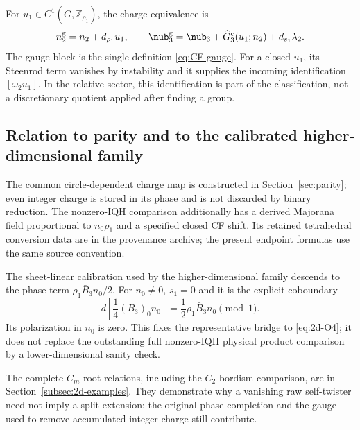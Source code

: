 For $u_1\in C^1(G,\mathbb Z_{\rho_1})$, the charge equivalence is
\begin{equation}\label{eq:2d-gauge}
 n_2^{\mathrm g}=n_2+d_{\rho_1}u_1,
 \qquad
 \nub_3^{\mathrm g}=\nub_3+\widehat G^c_3(u_1;n_2)+d_{s_1}\lambda_2.
\end{equation}
The gauge block is the single definition \eqref{eq:CF-gauge}. For a closed $u_1$, its Steenrod term vanishes by instability and it supplies the incoming identification $[\omega_2u_1]$. In the relative sector, this identification is part of the classification, not a discretionary quotient applied after finding a group.

\subsection{Relation to parity and to the calibrated higher-dimensional family}
The common circle-dependent charge map is constructed in Section~\ref{sec:parity}; even integer charge is stored in its phase and is not discarded by binary reduction. The nonzero-IQH comparison additionally has a derived Majorana field proportional to $\bar n_0\rho_1$ and a specified closed CF shift. Its retained tetrahedral conversion data are in the provenance archive; the present endpoint formulas use the same source convention.

The sheet-linear calibration used by the higher-dimensional family descends to the phase term
$\rho_1\bar B_3n_0/2$. For $n_0\ne0$, $s_1=0$ and it is the explicit coboundary
\begin{equation}\label{eq:2d-endpoint-rephase}
 d\left[\frac14(B_3)_0n_0\right]=\frac12\rho_1\bar B_3n_0\pmod1.
\end{equation}
Its polarization in $n_0$ is zero. This fixes the representative bridge to \eqref{eq:2d-O4}; it does not replace the outstanding full nonzero-IQH physical product comparison by a lower-dimensional sanity check.

The complete $C_m$ root relations, including the $C_2$ bordism comparison, are in Section~\ref{subsec:2d-examples}. They demonstrate why a vanishing raw self-twister need not imply a split extension: the original phase completion and the gauge used to remove accumulated integer charge still contribute.
